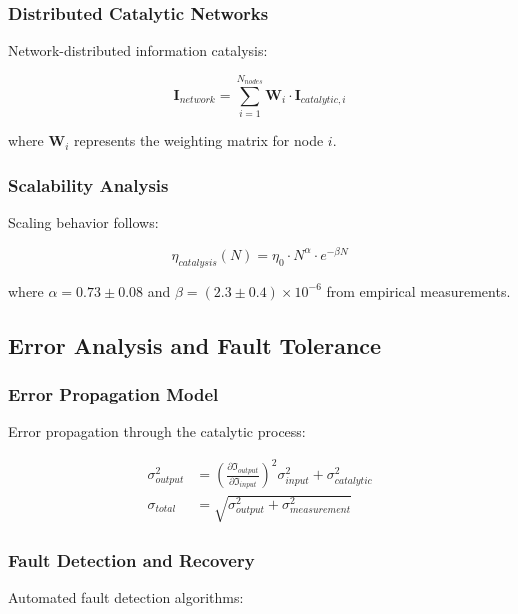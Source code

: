 \subsubsection{Distributed Catalytic Networks}

Network-distributed information catalysis:

\begin{equation}
\mathbf{I}_{network} = \sum_{i=1}^{N_{nodes}} \mathbf{W}_i \cdot \mathbf{I}_{catalytic,i}
\end{equation}

where $\mathbf{W}_i$ represents the weighting matrix for node $i$.

\subsubsection{Scalability Analysis}

Scaling behavior follows:

\begin{equation}
\eta_{catalysis}(N) = \eta_0 \cdot N^{\alpha} \cdot e^{-\beta N}
\end{equation}

where $\alpha = 0.73 \pm 0.08$ and $\beta = (2.3 \pm 0.4) \times 10^{-6}$ from empirical measurements.

\subsection{Error Analysis and Fault Tolerance}

\subsubsection{Error Propagation Model}

Error propagation through the catalytic process:

\begin{align}
\sigma^2_{output} &= \left(\frac{\partial \mathfrak{I}_{output}}{\partial \mathfrak{I}_{input}}\right)^2 \sigma^2_{input} + \sigma^2_{catalytic} \\
\sigma_{total} &= \sqrt{\sigma^2_{output} + \sigma^2_{measurement}}
\end{align}

\subsubsection{Fault Detection and Recovery}

Automated fault detection algorithms:

